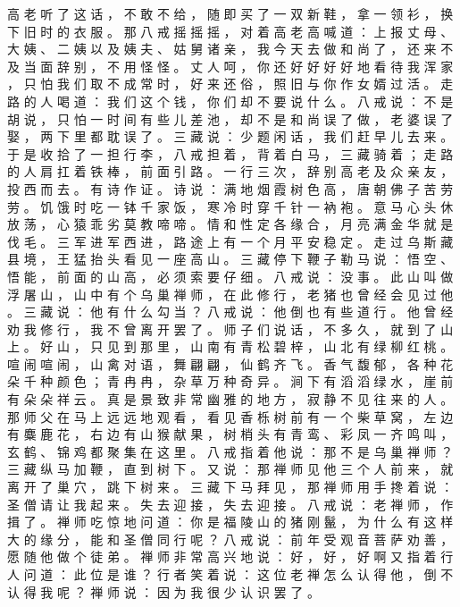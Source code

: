 {高 老 听 了 这 话 ， 不 敢 不 给 ， 随 即 买 了 一 双 新 鞋 ， 拿 一 领 衫 ， 换 下 旧 时 的 衣 服 。
那 八 戒 摇 摇 摇 ， 对 着 高 老 高 喊 道 ： 上 报 丈 母 、 大 姨 、 二 姨 以 及 姨 夫 、 姑 舅 诸 亲 ， 我 今 天 去 做 和 尚 了 ， 还 来 不 及 当 面 辞 别 ， 不 用 怪 怪 。
丈 人 呵 ， 你 还 好 好 好 好 地 看 待 我 浑 家 ， 只 怕 我 们 取 不 成 常 时 ， 好 来 还 俗 ， 照 旧 与 你 作 女 婿 过 活 。
走 路 的 人 喝 道 ： 我 们 这 个 钱 ， 你 们 却 不 要 说 什 么 。
八 戒 说 ： 不 是 胡 说 ， 只 怕 一 时 间 有 些 儿 差 池 ， 却 不 是 和 尚 误 了 做 ， 老 婆 误 了 娶 ， 两 下 里 都 耽 误 了 。 三 藏 说 ： 少 题 闲 话 ， 我 们 赶 早 儿 去 来 。
于 是 收 拾 了 一 担 行 李 ， 八 戒 担 着 ， 背 着 白 马 ， 三 藏 骑 着 ； 走 路 的 人 肩 扛 着 铁 棒 ， 前 面 引 路 。
一 行 三 次 ， 辞 别 高 老 及 众 亲 友 ， 投 西 而 去 。
有 诗 作 证 。
诗 说 ： 满 地 烟 霞 树 色 高 ， 唐 朝 佛 子 苦 劳 劳 。
饥 饿 时 吃 一 钵 千 家 饭 ， 寒 冷 时 穿 千 针 一 衲 袍 。
意 马 心 头 休 放 荡 ， 心 猿 乖 劣 莫 教 啼 啼 。
情 和 性 定 各 缘 合 ， 月 亮 满 金 华 就 是 伐 毛 。
三 军 进 军 西 进 ， 路 途 上 有 一 个 月 平 安 稳 定 。
走 过 乌 斯 藏 县 境 ， 王 猛 抬 头 看 见 一 座 高 山 。
三 藏 停 下 鞭 子 勒 马 说 ： 悟 空 、 悟 能 ， 前 面 的 山 高 ， 必 须 索 要 仔 细 。
八 戒 说 ： 没 事 。
此 山 叫 做 浮 屠 山 ， 山 中 有 个 乌 巢 禅 师 ， 在 此 修 行 ， 老 猪 也 曾 经 会 见 过 他 。
三 藏 说 ： 他 有 什 么 勾 当 ？ 八 戒 说 ： 他 倒 也 有 些 道 行 。
他 曾 经 劝 我 修 行 ， 我 不 曾 离 开 罢 了 。
师 子 们 说 话 ， 不 多 久 ， 就 到 了 山 上 。
好 山 ， 只 见 到 那 里 ， 山 南 有 青 松 碧 梓 ， 山 北 有 绿 柳 红 桃 。
喧 闹 喧 闹 ， 山 禽 对 语 ， 舞 翩 翩 ， 仙 鹤 齐 飞 。
香 气 馥 郁 ， 各 种 花 朵 千 种 颜 色 ； 青 冉 冉 ， 杂 草 万 种 奇 异 。
涧 下 有 滔 滔 绿 水 ， 崖 前 有 朵 朵 祥 云 。
真 是 景 致 非 常 幽 雅 的 地 方 ， 寂 静 不 见 往 来 的 人 。
那 师 父 在 马 上 远 远 地 观 看 ， 看 见 香 栎 树 前 有 一 个 柴 草 窝 ， 左 边 有 麋 鹿 花 ， 右 边 有 山 猴 献 果 ， 树 梢 头 有 青 鸾 、 彩 凤 一 齐 鸣 叫 ， 玄 鹤 、 锦 鸡 都 聚 集 在 这 里 。
八 戒 指 着 他 说 ： 那 不 是 乌 巢 禅 师 ？ 三 藏 纵 马 加 鞭 ， 直 到 树 下 。
又 说 ： 那 禅 师 见 他 三 个 人 前 来 ， 就 离 开 了 巢 穴 ， 跳 下 树 来 。
三 藏 下 马 拜 见 ， 那 禅 师 用 手 搀 着 说 ： 圣 僧 请 让 我 起 来 。
失 去 迎 接 ， 失 去 迎 接 。
八 戒 说 ： 老 禅 师 ， 作 揖 了 。
禅 师 吃 惊 地 问 道 ： 你 是 福 陵 山 的 猪 刚 鬣 ， 为 什 么 有 这 样 大 的 缘 分 ， 能 和 圣 僧 同 行 呢 ？ 八 戒 说 ： 前 年 受 观 音 菩 萨 劝 善 ， 愿 随 他 做 个 徒 弟 。
禅 师 非 常 高 兴 地 说 ： 好 ， 好 ， 好 啊 又 指 着 行 人 问 道 ： 此 位 是 谁 ？ 行 者 笑 着 说 ： 这 位 老 禅 怎 么 认 得 他 ， 倒 不 认 得 我 呢 ？ 禅 师 说 ： 因 为 我 很 少 认 识 罢 了 。
}
